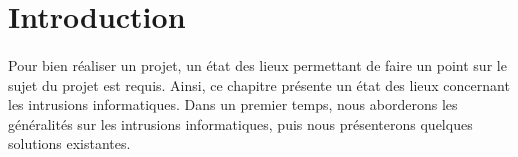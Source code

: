 \section*{Introduction}
	\paragraph{}
      Pour bien réaliser un projet, un état des lieux permettant de faire un point sur le sujet du projet est requis. Ainsi, ce chapitre présente un état des lieux concernant les intrusions informatiques. Dans un premier temps, nous aborderons les généralités sur les intrusions informatiques, puis nous présenterons quelques solutions existantes.